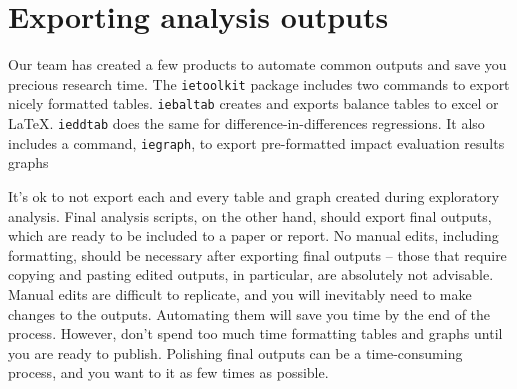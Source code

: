 \section{Exporting analysis outputs}

Our team has created a few products to automate common outputs and save you 
precious research time.
The \texttt{ietoolkit} package includes two commands to export nicely formatted tables.
\texttt{iebaltab} 
creates and exports balance tables to excel or {\LaTeX}. 
\texttt{ieddtab} 
does the same for difference-in-differences regressions.
It also includes a command, \texttt{iegraph},
to export pre-formatted impact evaluation results graphs

It's ok to not export each and every table and graph created during exploratory analysis. 
Final analysis scripts, on the other hand, should export final outputs, 
which are ready to be included to a paper or report.
No manual edits, including formatting, should be necessary after exporting final outputs -- 
those that require copying and pasting edited outputs, 
in particular, are absolutely not advisable. 
Manual edits are difficult to replicate, 
and you will inevitably need to make changes to the outputs. 
Automating them will save you time by the end of the process. 
However, don't spend too much time formatting tables and graphs until you are ready to publish.
Polishing final outputs can be a time-consuming process, 
and you want to it as few times as possible.

